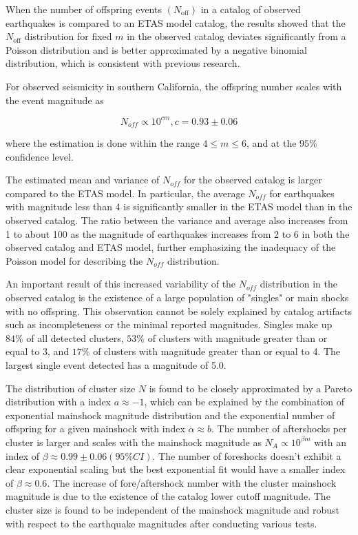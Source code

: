 \documentclass[12pt]{article} %
\theoremstyle{plain}
\begin{document}
	When the number of offspring events $(N_{\text{off}})$ in a catalog of observed earthquakes is compared to an ETAS model catalog, the results showed that the $N_{\text{off}}$ distribution for fixed $m$ in the observed catalog deviates significantly from a Poisson distribution and is better approximated by a negative binomial distribution, which is consistent with previous research. 
	
	For observed seismicity in southern California, the offspring number scales with the event magnitude as 
	
	\begin{equation} \label{eq:offspring_number_soCal}
		N_{off}\propto 10^{cm},c = 0.93\pm 0.06
	\end{equation}
	
	
	\noindent where the estimation is done within the range $4 \leq m \leq6$, and at the $95\%$ confidence level. 
	
	The estimated mean and variance of $N_{off}$ for the observed catalog is larger compared to the ETAS model. In particular, the average $N_{off}$ for earthquakes with magnitude less than 4 is significantly smaller in the ETAS model than in the observed catalog. The ratio between the variance and average also increases from 1 to about 100 as the magnitude of earthquakes increases from 2 to 6 in both the observed catalog and ETAS model, further emphasizing the inadequacy of the Poisson model for describing the $N_{off}$ distribution.
	
	An important result of this increased variability of the $N_{off}$ distribution in the observed catalog is the existence of a large population of "singles" or main shocks with no offspring. This observation cannot be solely explained by catalog artifacts such as incompleteness or the minimal reported magnitudes. Singles make up $84\%$ of all detected clusters, $53\%$ of clusters with magnitude greater than or equal to 3, and $17\%$ of clusters with magnitude greater than or equal to 4. The largest single event detected has a magnitude of 5.0.
	
	The distribution of cluster size $N$ is found to be closely approximated by a Pareto distribution with a index $a \approx -1$, which can be explained by the combination of exponential mainshock magnitude distribution and the exponential number of offspring for a given mainshock with index $\alpha \approx b$. The number of aftershocks per cluster is larger and scales with the mainshock magnitude as $N_A \propto 10^{\beta m}$ with an index of $\beta \approx 0.99 \pm 0.06(95\% CI)$. The number of foreshocks doesn't exhibit a clear exponential scaling but the best exponential fit would have a smaller index of $\beta \approx 0.6$. The increase of fore/aftershock number with the cluster mainshock magnitude is due to the existence of the catalog lower cutoff magnitude. The cluster size is found to be independent of the mainshock magnitude and robust with respect to the earthquake magnitudes after conducting various tests.
	
\end{document}
